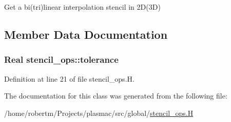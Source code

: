 Get a bi(tri)linear interpolation stencil in 2D(3D) 



\subsection{Member Data Documentation}
\subsubsection[{\texorpdfstring{tolerance}{tolerance}}]{\setlength{\rightskip}{0pt plus 5cm}Real stencil\+\_\+ops\+::tolerance\hspace{0.3cm}{\ttfamily [static]}}\hypertarget{classstencil__ops_a73be0c634e7d8f1ae48b22a1661f0694}{}\label{classstencil__ops_a73be0c634e7d8f1ae48b22a1661f0694}


Definition at line 21 of file stencil\+\_\+ops.\+H.



The documentation for this class was generated from the following file\+:\begin{DoxyCompactItemize}
\item 
/home/robertm/\+Projects/plasmac/src/global/\hyperlink{stencil__ops_8H}{stencil\+\_\+ops.\+H}\end{DoxyCompactItemize}
